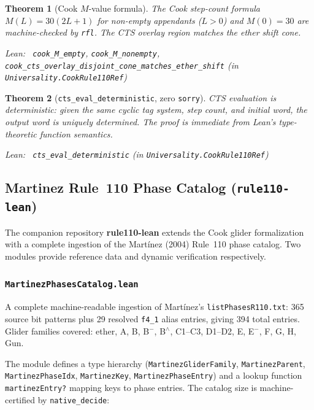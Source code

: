 \documentclass[11pt,a4paper]{article}
\newenvironment{leanref}%
  {\par\smallskip\noindent\begingroup\raggedright\textup{Lean:}~}%
  {\par\endgroup}
\newtheorem{theorem}{Theorem}[section]
\theoremstyle{definition}
\begin{document}
\begin{theorem}[Cook $M$-value formula]\label{thm:cook-m}
The Cook step-count formula $M(L) = 30(2L+1)$ for non-empty appendants ($L > 0$)
and $M(0) = 30$ are machine-checked by \texttt{rfl}.
The CTS overlay region matches the ether shift cone.

\begin{leanref}
\lstinline|cook_M_empty|, \lstinline|cook_M_nonempty|,
\lstinline|cook_cts_overlay_disjoint_cone_matches_ether_shift|
\textup{(in \texttt{Universality.CookRule110Ref})}
\end{leanref}
\end{theorem}

\begin{theorem}[\lstinline|cts_eval_deterministic|, zero \texttt{sorry}]
CTS evaluation is deterministic: given the same cyclic tag system, step count,
and initial word, the output word is uniquely determined.
The proof is immediate from Lean's type-theoretic function semantics.

\begin{leanref}
\lstinline|cts_eval_deterministic|
\textup{(in \texttt{Universality.CookRule110Ref})}
\end{leanref}
\end{theorem}

\subsection{Martinez Rule~110 Phase Catalog
  (\texttt{rule110-lean})}\label{subsec:martinez-catalog}

The companion repository \textbf{rule110-lean} extends the Cook glider
formalization with a complete ingestion of the Mart\'{i}nez
(2004) Rule~110 phase catalog.  Two modules provide reference data and
dynamic verification respectively.

\subsubsection*{\texttt{MartinezPhasesCatalog.lean}}

A complete machine-readable ingestion of Mart\'{i}nez's
\texttt{listPhasesR110.txt}: 365 source bit patterns plus 29 resolved
\texttt{f4\_1} alias entries, giving 394 total entries.
Glider families covered: ether, A, B, B${}^-$, B${}^\wedge$, C1--C3,
D1--D2, E, E${}^-$, F, G, H, Gun.

The module defines a type hierarchy (\lstinline|MartinezGliderFamily|,
\lstinline|MartinezParent|, \lstinline|MartinezPhaseIdx|,
\lstinline|MartinezKey|, \lstinline|MartinezPhaseEntry|) and a lookup
function \lstinline|martinezEntry?| mapping keys to phase entries.
The catalog size is machine-certified by \lstinline|native_decide|:
\end{document}
